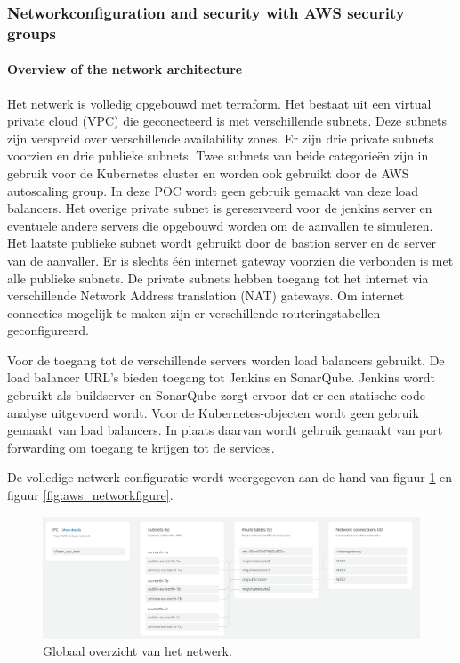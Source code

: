 \subsubsection{
{Networkconfiguration and security with AWS security groups}}
\label{sec:Netwerkconfiguratie en beveiliging met AWS security groups}

\paragraph{
{Overview of the network architecture}}
\label{sec:Netwerkarchitectuur overzicht}

Het netwerk is volledig opgebouwd met terraform. Het bestaat uit een virtual private cloud (VPC) die geconecteerd is met verschillende subnets. Deze subnets zijn verspreid over verschillende availability zones. Er zijn drie private subnets voorzien en drie publieke subnets. Twee subnets van beide categorieën zijn in gebruik voor de Kubernetes cluster en worden ook gebruikt door de AWS autoscaling group. In deze POC wordt geen gebruik gemaakt van deze load balancers. Het overige private subnet is gereserveerd voor de jenkins server en eventuele andere servers die opgebouwd worden om de aanvallen te simuleren. Het laatste publieke subnet wordt gebruikt door de bastion server en de server van de aanvaller. Er is slechts één internet gateway voorzien die verbonden is met alle publieke subnets. De private subnets hebben toegang tot het internet via verschillende Network Address translation (NAT) gateways. Om internet connecties mogelijk te maken zijn er verschillende routeringstabellen geconfigureerd. 
\newline

Voor de toegang tot de verschillende servers worden load balancers gebruikt. De load balancer URL's bieden toegang tot Jenkins en SonarQube. Jenkins wordt gebruikt als buildserver en SonarQube zorgt ervoor dat er een statische code analyse uitgevoerd wordt. Voor de Kubernetes-objecten wordt geen gebruik gemaakt van load balancers. In plaats daarvan wordt gebruik gemaakt van port forwarding om toegang te krijgen tot de services.
\newline

De volledige netwerk configuratie wordt weergegeven aan de hand van figuur \ref{fig:aws_network} en figuur \ref{fig:aws_networkfigure}.

\begin{figure}[H]
  \includegraphics[scale=0.48]{graphics/aws_network.png}
\caption{\label{fig:aws_network} Globaal overzicht van het netwerk.}
\end{figure}

